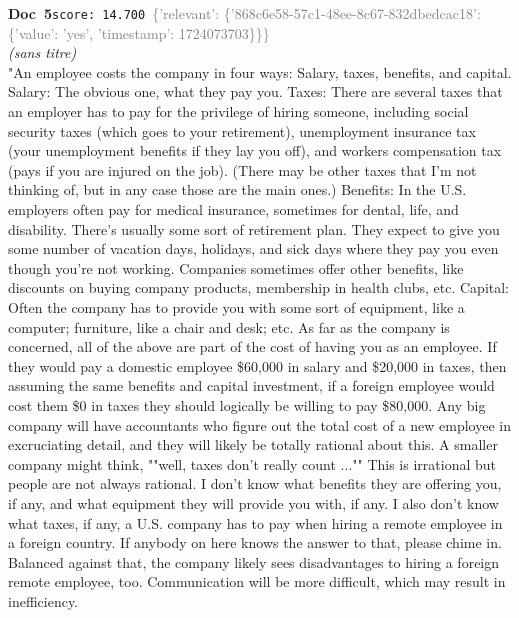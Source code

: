 \documentclass[a4paper,11pt]{article}
\begin{document}
\begin{docenv}
{\footnotesize\textcolor{doccolor}{\textbf{Doc~5}}}\hfill{\tiny\texttt{score:~14.700}}\ {\tiny\textcolor{gray}{\{'relevant': \{'868c6e58-57c1-48ee-8c67-832dbedcac18': \{'value': 'yes', 'timestamp': 1724073703\}\}\}}}\\[3pt]
{\small\textit{(sans titre)}}\\[2pt]
\vspace{2pt}
{\footnotesize 
"An employee costs the company in four ways: Salary, taxes, benefits, and capital. Salary: The obvious one, what they pay you. Taxes: There are several taxes that an employer has to pay for the privilege of hiring someone, including social security taxes (which goes to your retirement), unemployment insurance tax (your unemployment benefits if they lay you off), and workers compensation tax (pays if you are injured on the job). (There may be other taxes that I'm not thinking of, but in any case those are the main ones.) Benefits: In the U.S. employers often pay for medical insurance, sometimes for dental, life, and disability. There's usually some sort of retirement plan. They expect to give you some number of vacation days, holidays, and sick days where they pay you even though you're not working. Companies sometimes offer other benefits, like discounts on buying company products, membership in health clubs, etc. Capital: Often the company has to provide you with some sort of equipment, like a computer; furniture, like a chair and desk; etc. As far as the company is concerned, all of the above are part of the cost of having you as an employee. If they would pay a domestic employee \$60,000 in salary and \$20,000 in taxes, then assuming the same benefits and capital investment, if a foreign employee would cost them \$0 in taxes they should logically be willing to pay \$80,000. Any big company will have accountants who figure out the total cost of a new employee in excruciating detail, and they will likely be totally rational about this. A smaller company might think, ""well, taxes don't really count ..."" This is irrational but people are not always rational. I don't know what benefits they are offering you, if any, and what equipment they will provide you with, if any. I also don't know what taxes, if any, a U.S. company has to pay when hiring a remote employee in a foreign country. If anybody on here knows the answer to that, please chime in. Balanced against that, the company likely sees disadvantages to hiring a foreign remote employee, too. Communication will be more difficult, which may result in inefficiency.}
\end{docenv}
\end{document}
